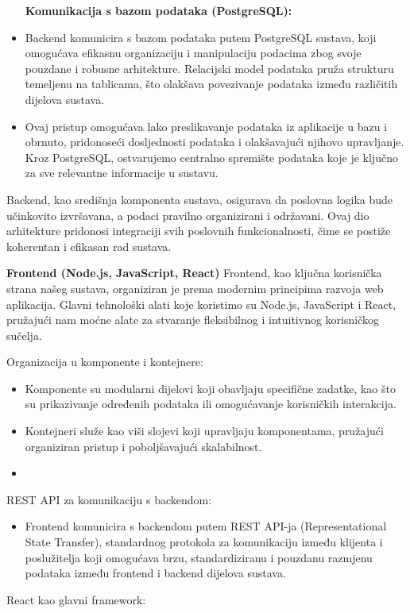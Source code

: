 \begin{itemize}
\textbf{Komunikacija s bazom podataka (PostgreSQL):}
\item Backend komunicira s bazom podataka putem PostgreSQL sustava, koji omogućava efikasnu organizaciju i manipulaciju podacima zbog svoje pouzdane i robusne arhitekture. Relacijski model podataka pruža strukturu temeljenu na tablicama, što olakšava povezivanje podataka između različitih dijelova sustava.
    \item Ovaj pristup omogućava lako preslikavanje podataka iz aplikacije u bazu i obrnuto, pridonoseći dosljednosti podataka i olakšavajući njihovo upravljanje. Kroz PostgreSQL, ostvarujemo centralno spremište podataka koje je ključno za sve relevantne informacije u sustavu.
\end{itemize}
Backend, kao središnja komponenta sustava, osigurava da poslovna logika bude učinkovito izvršavana, a podaci pravilno organizirani i održavani. Ovaj dio arhitekture pridonosi integraciji svih poslovnih funkcionalnosti, čime se postiže koherentan i efikasan rad sustava.\newline

 
 

\textbf{Frontend (Node.js, JavaScript, React)}
Frontend, kao ključna korisnička strana našeg sustava, organiziran je prema modernim principima razvoja web aplikacija. Glavni tehnološki alati koje koristimo su Node.js, JavaScript i React, pružajući nam moćne alate za stvaranje fleksibilnog i intuitivnog korisničkog sučelja.

Organizacija u komponente i kontejnere:

\begin{itemize}
    \item Komponente su modularni dijelovi koji obavljaju specifične zadatke, kao što su prikazivanje određenih podataka ili omogućavanje korisničkih interakcija.
    \item Kontejneri služe kao viši slojevi koji upravljaju komponentama, pružajući organiziran pristup i poboljšavajući skalabilnost.
    \item 
\end{itemize}
REST API za komunikaciju s backendom:

\begin{itemize}
    \item Frontend komunicira s backendom putem REST API-ja (Representational State Transfer), standardnog protokola za komunikaciju između klijenta i poslužitelja koji omogućava brzu, standardiziranu i pouzdanu razmjenu podataka između frontend i backend dijelova sustava.
\end{itemize}
React kao glavni framework:

